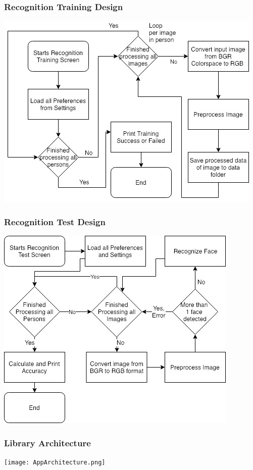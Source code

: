 \documentclass[10pt]{beamer}
\begin{document}
\begin{frame}
\frametitle{Recognition Training Design}
\includegraphics[scale=.55]{RecognitionTraining.jpg}\medskip\\
\end{frame}
\begin{frame}
\frametitle{Recognition Test Design}
\includegraphics[scale=.55]{RecognitionTest.jpg}\medskip\\
\end{frame}
\begin{frame}
\frametitle{Library Architecture}
\texttt{[image: AppArchitecture.png]}
\end{frame}
\end{document}
